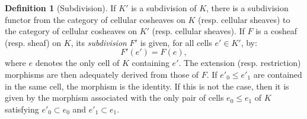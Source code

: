 \documentclass[10pt]{amsart}
\theoremstyle{definition}
\newtheorem{defi}[theo]{Definition}
\numberwithin{equation}{section}
\numberwithin{figure}{section}
\begin{document}
\begin{defi}[Subdivision]\label{definition:subd}
If $K'$ is a subdivision of $K$, there is a subdivision functor from the category of cellular cosheaves on $K$ (resp. cellular sheaves) to the category of cellular cosheaves on $K'$ (resp. cellular sheaves). If $F$ is a cosheaf (resp. sheaf) on $K$, its \emph{subdivision} $F'$ is given, for all cells $e'\in K'$, by:
\begin{equation*}
F'(e')=F(e),
\end{equation*}
where $e$ denotes the only cell of $K$ containing $e'$. The extension (resp. restriction) morphisms are then adequately derived from those of $F$. If $e'_0\leq e'_1$ are contained in the same cell, the morphism is the identity. If this is not the case, then it is given by the morphism associated with the only pair of cells $e_0\leq e_1$ of $K$ satisfying $e'_0\subset e_0$ and $e'_1\subset e_1$.
\end{defi}
\end{document}
